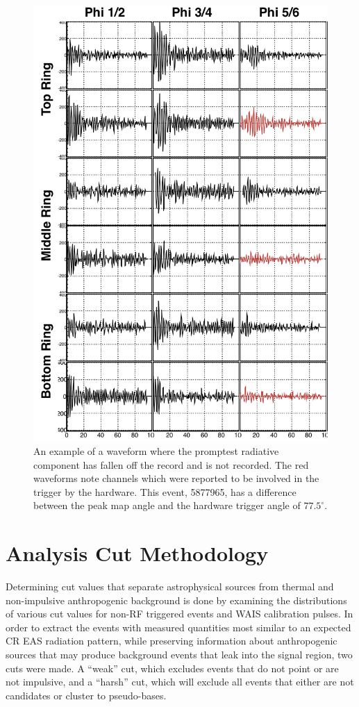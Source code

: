 \begin{figure}
	\centering
	\includegraphics[height=0.9\textheight]{figures/EarlyWaveform}
	\caption{An example of a waveform where the promptest radiative component has fallen off the record and is not recorded.  The red waveforms note channels which were reported to be involved in the trigger by the hardware.  This event, 5877965, has a difference between the peak map angle and the hardware trigger angle of $77.5^\circ$.} 
	\label{fig:earlyWaveform}
\end{figure}		
		

\section{Analysis Cut Methodology}%
	Determining cut values that separate astrophysical sources from thermal and non-impulsive anthropogenic background is done by examining the distributions of various cut values for non-RF triggered events and WAIS calibration pulses.  In order to extract the events with measured quantities most similar to an expected CR EAS radiation pattern, while preserving information about anthropogenic sources that may produce background events that leak into the signal region, two cuts were made. A ``weak'' cut, which excludes events that do not point or are not impulsive, and a ``harsh'' cut, which will exclude all events that either are not candidates or cluster to pseudo-bases.
	
